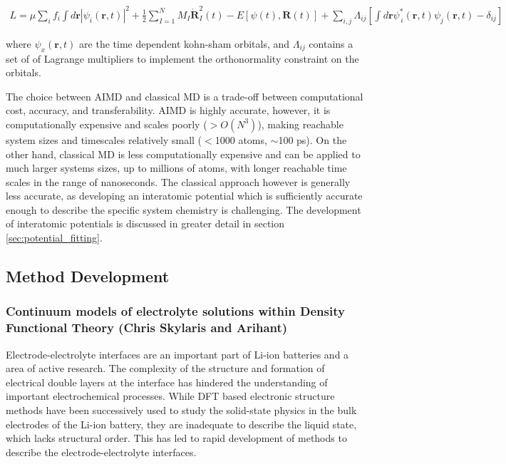 \documentclass[../main.tex]{subfiles}
\begin{document}
\begin{gather}
    L=\mu \sum_i f_i \int d\textbf{r}|\psi_i(\textbf{r},t)|^2
    +\frac{1}{2}\sum^N_{I=1} M_I\dot{\textbf{R}}^2_I (t)- E\left[{\psi(t)}, \textbf{R}(t)\right]
    +\sum_{i,j} \Lambda_{ij}\left[\int d\textbf{r}\psi^*_{\,i}(\textbf{r},t)\psi_j(\textbf{r}, t)- \delta_{ij}\right]
\end{gather}

where  $\psi_x(\textbf{r},t)$ are the time dependent kohn-sham orbitals, and $\Lambda_{ij}$ contains a set of of Lagrange multipliers to implement the orthonormality constraint on the orbitals.

The choice between AIMD and classical MD is a trade-off between computational cost, accuracy, and transferability. AIMD is highly accurate, however, it is computationally expensive and scales poorly ($>O(N^3)$), making reachable system sizes and timescales relatively small ($<$1000 atoms, $\sim$100 ps). On the other hand, classical MD is less computationally expensive and can be applied to much larger systems sizes, up to millions of atoms, with longer reachable time scales in the range of nanoseconds. The classical approach however is generally less accurate, as developing an interatomic potential which is sufficiently accurate enough to describe the specific system chemistry is challenging. The development of interatomic potentials is discussed in greater detail in section \ref{sec:potential_fitting}.


\subsection{Method Development}

\subsubsection{Continuum models of electrolyte solutions within Density Functional Theory (Chris Skylaris and Arihant)}
\label{sec:dft+cont}
Electrode-electrolyte interfaces are an important part of Li-ion batteries and a area of active research.\cite{Gauthier2015, Yu2018} The complexity of the structure and formation of electrical double layers at the interface has hindered the understanding of important electrochemical processes. While DFT based electronic structure methods have been successively used to study the solid-state physics in the bulk electrodes of the Li-ion battery, they are inadequate to describe the liquid state, which lacks structural order. This has led to rapid development of methods to describe the electrode-electrolyte interfaces.\cite{Jinnouchi2018} 
\end{document}

